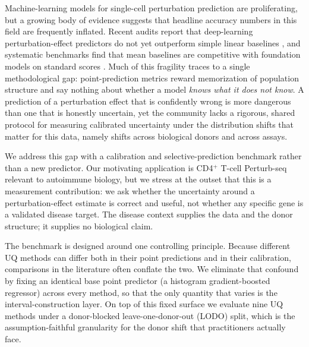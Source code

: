 \documentclass{article}
\begin{document}
Machine-learning models for single-cell perturbation prediction are
proliferating, but a growing body of evidence suggests that headline
accuracy numbers in this field are frequently inflated. Recent audits
report that deep-learning perturbation-effect predictors do not yet
outperform simple linear baselines \citep{ahlmanneltze2025deep}, and
systematic benchmarks find that mean baselines are competitive with
foundation models on standard scores \citep{wu2024perturbench}. Much of
this fragility traces to a single methodological gap: point-prediction
metrics reward memorization of population structure and say nothing about
whether a model \emph{knows what it does not know}. A prediction of a
perturbation effect that is confidently wrong is more dangerous than one
that is honestly uncertain, yet the community lacks a rigorous, shared
protocol for measuring calibrated uncertainty under the distribution
shifts that matter for this data, namely shifts across biological donors
and across assays.

We address this gap with a calibration and selective-prediction
benchmark rather than a new predictor. Our motivating application is
CD4$^{+}$ T-cell Perturb-seq relevant to autoimmune biology, but we
stress at the outset that this is a measurement contribution: we ask
whether the uncertainty around a perturbation-effect estimate is
correct and useful, not whether any specific gene is a validated disease
target. The disease context supplies the data and the donor structure;
it supplies no biological claim.

The benchmark is designed around one controlling principle. Because
different UQ methods can differ both in their point predictions and in
their calibration, comparisons in the literature often conflate the two.
We eliminate that confound by fixing an identical base point predictor
(a histogram gradient-boosted regressor) across every method, so that
the only quantity that varies is the interval-construction layer. On top
of this fixed surface we evaluate nine UQ methods under a donor-blocked
leave-one-donor-out (LODO) split, which is the assumption-faithful
granularity for the donor shift that practitioners actually face.
\end{document}
